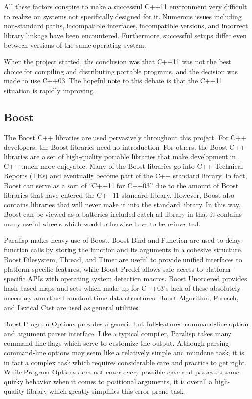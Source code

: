 \documentclass[abstracton]{scrartcl}
\begin{document}
All these factors conspire to make a successful C++11 environment very difficult to realize on systems not specifically designed for it. Numerous issues including non-standard paths, incompatible interfaces, incompatible versions, and incorrect library linkage have been encountered. Furthermore, successful setups differ even between versions of the same operating system.

When the project started, the conclusion was that C++11 was not the best choice for compiling and distributing portable programs, and the decision was made to use C++03. The hopeful note to this debate is that the C++11 situation is rapidly improving.

\subsection{Boost}
\label{sec:boost}

The Boost C++ libraries are used pervasively throughout this project. For C++ developers, the Boost libraries need no introduction. For others, the Boost C++ libraries are a set of high-quality portable libraries that make development in C++ much more enjoyable. Many of the Boost libraries go into C++ Technical Reports (TRs) and eventually become part of the C++ standard library. In fact, Boost can serve as a sort of ``C++11 for C++03'' due to the amount of Boost libraries that have entered the C++11 standard library. However, Boost also contains libraries that will never make it into the standard library. In this way, Boost can be viewed as a batteries-included catch-all library in that it contains many useful wheels which would otherwise have to be reinvented.

Paralisp makes heavy use of Boost. Boost Bind and Function are used to delay function calls by storing the function and its arguments in a cohesive structure. Boost Filesystem, Thread, and Timer are useful to provide unified interfaces to platform-specific features, while Boost Predef allows safe access to platform-specific APIs with operating system detection macros. Boost Unordered provides hash-based maps and sets which make up for C++03's lack of these absolutely necessary amortized constant-time data structures. Boost Algorithm, Foreach, and Lexical Cast are used as general utilities.

Boost Program Options provides a generic but full-featured command-line option and argument parser interface. Like a typical compiler, Paralisp takes many command-line flags which serve to customize the output. Although parsing command-line options may seem like a relatively simple and mundane task, it is in fact a complex task which requires considerable care and practice to get right. While Program Options does not cover every possible case and possesses some quirky behavior when it comes to positional arguments, it is overall a high-quality library which greatly simplifies this error-prone task.
\end{document}
